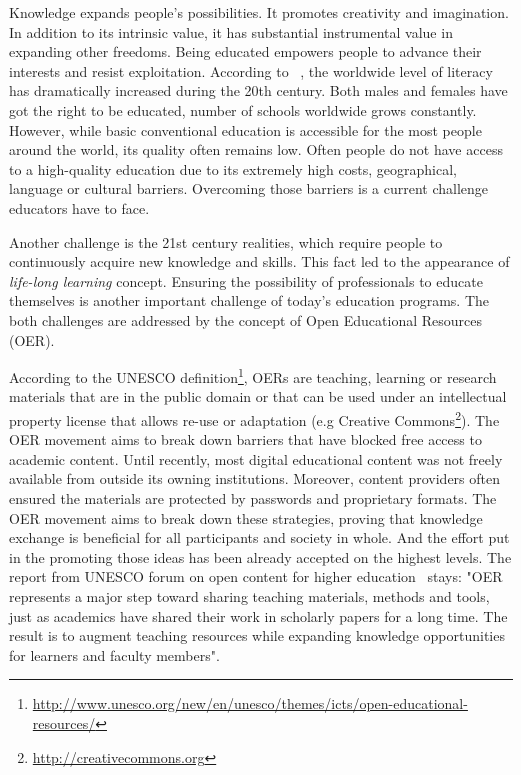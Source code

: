 \documentclass[ngerman,UKenglish,table]{scrbook}
\begin{document}
Knowledge expands people’s possibilities.
It promotes creativity and imagination.
In addition to its intrinsic value, it has substantial instrumental value in expanding other freedoms.
Being educated empowers people to advance their interests and resist exploitation.
According to ~\cite{klugman2010human}, the worldwide level of literacy has dramatically increased during the 20th century.
Both males and females have got the right to be educated, number of schools worldwide grows constantly.
However, while basic conventional education is accessible for the most people around the world, its quality often remains low.
Often people do not have access to a high-quality education due to its extremely high costs, geographical, language or cultural barriers.
Overcoming those barriers is a current challenge educators have to face.

Another challenge is the 21st century realities, which require people to continuously acquire new knowledge and skills.
This fact led to the appearance of \emph{life-long learning} concept.
Ensuring the possibility of professionals to educate themselves is another important challenge of today's education programs.
The both challenges are addressed by the concept of Open Educational Resources (OER).
 
According to the UNESCO definition\footnote{\url{http://www.unesco.org/new/en/unesco/themes/icts/open-educational-resources/}}, OERs are teaching, learning or research materials that are in the public domain or that can be used under an intellectual property license that allows re-use or adaptation (e.g Creative Commons\footnote{\url{http://creativecommons.org}}).
The OER movement aims to break down barriers that have blocked free access to academic content.
Until recently, most digital educational content was not freely available from outside its owning institutions.
Moreover, content providers often ensured the materials are protected by passwords and proprietary formats.
The OER movement aims to break down these strategies, proving that knowledge exchange is beneficial for all participants and society in whole.
And the effort put in the promoting those ideas has been already accepted on the highest levels. 
The report from UNESCO forum on open content for higher education~\cite{unesco} stays: "OER represents a major step toward sharing teaching materials, methods and tools, just as academics have shared their work in scholarly papers for a long time.
The result is to augment teaching resources while expanding knowledge opportunities for learners and faculty members". 
\end{document}
